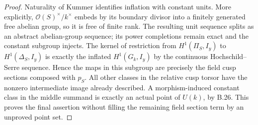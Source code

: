 \documentclass[11pt,oneside]{article}
\begin{document}
\begin{proof}
Naturality of Kummer identifies inflation with
constant units. More explicitly,
$\mathcal O(S)^\times/k^\times$ embeds by its
boundary divisor into a finitely generated
free abelian group, so it is free of finite
rank. The resulting unit sequence splits as
an abstract abelian-group sequence; its power
completions remain exact and the constant
subgroup injects. The kernel of restriction
from $H^1(\Pi_S,I_y)$ to $H^1(\Delta_S,I_y)$
is exactly the inflated $H^1(G_k,I_y)$ by
the continuous Hochschild--Serre sequence.
Hence the maps in this subgroup are precisely
the field cusp sections composed with $p_S$.
All other classes in the relative cusp torsor
have the nonzero intermediate image already
described. A morphism-induced constant class
in the middle summand is exactly an actual
point of $U(k)$, by B.26. This proves the final
assertion without filling the remaining field
section term by an unproved point set.
\end{proof}
\end{document}
